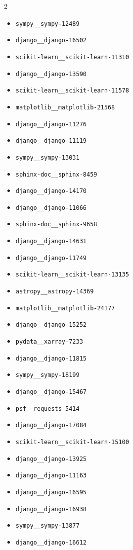 \documentclass{article}
\begin{document}
\begin{multicols}{2}
\begin{itemize}
\item \texttt{sympy\_\_sympy-12489}
\item \texttt{django\_\_django-16502}
\item \texttt{scikit-learn\_\_scikit-learn-11310}
\item \texttt{django\_\_django-13590}
\item \texttt{scikit-learn\_\_scikit-learn-11578}
\item \texttt{matplotlib\_\_matplotlib-21568}
\item \texttt{django\_\_django-11276}
\item \texttt{django\_\_django-11119}
\item \texttt{sympy\_\_sympy-13031}
\item \texttt{sphinx-doc\_\_sphinx-8459}
\item \texttt{django\_\_django-14170}
\item \texttt{django\_\_django-11066}
\item \texttt{sphinx-doc\_\_sphinx-9658}
\item \texttt{django\_\_django-14631}
\item \texttt{django\_\_django-11749}
\item \texttt{scikit-learn\_\_scikit-learn-13135}
\item \texttt{astropy\_\_astropy-14369}
\item \texttt{matplotlib\_\_matplotlib-24177}
\item \texttt{django\_\_django-15252}
\item \texttt{pydata\_\_xarray-7233}
\item \texttt{django\_\_django-11815}
\item \texttt{sympy\_\_sympy-18199}
\item \texttt{django\_\_django-15467}
\item \texttt{psf\_\_requests-5414}
\item \texttt{django\_\_django-17084}
\item \texttt{scikit-learn\_\_scikit-learn-15100}
\item \texttt{django\_\_django-13925}
\item \texttt{django\_\_django-11163}
\item \texttt{django\_\_django-16595}
\item \texttt{django\_\_django-16938}
\item \texttt{sympy\_\_sympy-13877}
\item \texttt{django\_\_django-16612}

\end{itemize}
\end{multicols}
\end{document}
